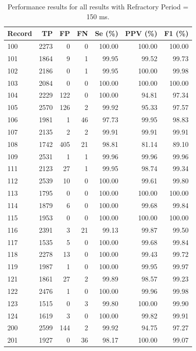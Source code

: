 \documentclass[11pt]{article}
\begin{document}
\begin{table}[p]
\centering
\scriptsize
\setlength{\tabcolsep}{4pt}
\renewcommand{\arraystretch}{1.1}
\caption{Performance results for all results with Refractory Period = 150 ms.}
\label{tab:all_records_150}
\begin{tabular}{lrrrrrr}
\toprule
\textbf{Record} & \textbf{TP} & \textbf{FP} & \textbf{FN} & \textbf{Se (\%)} & \textbf{PPV (\%)} & \textbf{F1 (\%)} \\
\midrule
100 & 2273 & 0 & 0 & 100.00 & 100.00 & 100.00 \\
101 & 1864 & 9 & 1 & 99.95 & 99.52 & 99.73 \\
102 & 2186 & 0 & 1 & 99.95 & 100.00 & 99.98 \\
103 & 2084 & 0 & 0 & 100.00 & 100.00 & 100.00 \\
104 & 2229 & 122 & 0 & 100.00 & 94.81 & 97.34 \\
105 & 2570 & 126 & 2 & 99.92 & 95.33 & 97.57 \\
106 & 1981 & 1 & 46 & 97.73 & 99.95 & 98.83 \\
107 & 2135 & 2 & 2 & 99.91 & 99.91 & 99.91 \\
108 & 1742 & 405 & 21 & 98.81 & 81.14 & 89.10 \\
109 & 2531 & 1 & 1 & 99.96 & 99.96 & 99.96 \\
111 & 2123 & 27 & 1 & 99.95 & 98.74 & 99.34 \\
112 & 2539 & 10 & 0 & 100.00 & 99.61 & 99.80 \\
113 & 1795 & 0 & 0 & 100.00 & 100.00 & 100.00 \\
114 & 1879 & 6 & 0 & 100.00 & 99.68 & 99.84 \\
115 & 1953 & 0 & 0 & 100.00 & 100.00 & 100.00 \\
116 & 2391 & 3 & 21 & 99.13 & 99.87 & 99.50 \\
117 & 1535 & 5 & 0 & 100.00 & 99.68 & 99.84 \\
118 & 2278 & 13 & 0 & 100.00 & 99.43 & 99.72 \\
119 & 1987 & 1 & 0 & 100.00 & 99.95 & 99.97 \\
121 & 1861 & 27 & 2 & 99.89 & 98.57 & 99.23 \\
122 & 2476 & 1 & 0 & 100.00 & 99.96 & 99.98 \\
123 & 1515 & 0 & 3 & 99.80 & 100.00 & 99.90 \\
124 & 1619 & 3 & 0 & 100.00 & 99.82 & 99.91 \\
200 & 2599 & 144 & 2 & 99.92 & 94.75 & 97.27 \\
201 & 1927 & 0 & 36 & 98.17 & 100.00 & 99.07 \\

\end{tabular}
\end{table}
\end{document}
